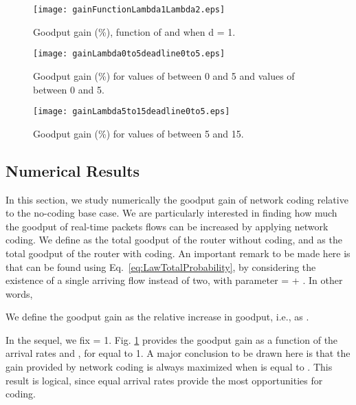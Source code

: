 \documentclass[preprint,12pt]{elsarticle}
\theoremstyle{definition}
\theoremstyle{plain}
\theoremstyle{remark}
\begin{document}
\begin{figure}[t]
\begin{center}
  \texttt{[image: gainFunctionLambda1Lambda2.eps]}
\end{center}
  \caption{Goodput gain (\%), function of  and  when d = 1.}
  \label{fig:gainFunctionLambda1Lambda2}
\end{figure}


\begin{figure}[t]
\begin{center}
  \texttt{[image: gainLambda0to5deadline0to5.eps]}
\end{center}
  \caption{Goodput gain (\%) for values of  between 0 and 5 and values of  between 0 and 5.}
  \label{fig:gainLambda0to5deadline0to5}
\end{figure}

\begin{figure}[t]
\begin{center}
  \texttt{[image: gainLambda5to15deadline0to5.eps]}
\end{center}
  \caption{Goodput gain (\%) for values of  between 5 and 15.}
  \label{fig:gainLambda5to15deadline0to5}
\end{figure}

\subsection{Numerical Results} \label{section:numerical-results-coding}
In this section, we study numerically the goodput gain of network coding relative to the no-coding base case. We are particularly interested in finding how much the goodput of real-time packets flows can be increased by applying network coding. We define  as the total goodput of the router without coding, and  as the total goodput of the router with coding. An important remark to be made here is that  can be found using Eq.~\eqref{eq:LawTotalProbability}, by considering the existence of a single arriving flow instead of two, with parameter  =  + . In other words,
 
We define the goodput gain as the relative increase in goodput, i.e., as .

In the sequel, we fix  = 1. Fig. \ref{fig:gainFunctionLambda1Lambda2} provides the goodput gain as a function of the arrival rates  and , for  equal to 1. A major conclusion to be drawn here is that the gain provided by network coding is always maximized when  is equal to . This result is logical, since equal arrival rates provide the most opportunities for coding.
\end{document}
